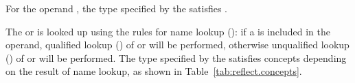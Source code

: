 \begin{std.txt}
\pnum
For the operand \tcode{::}, the type specified by the
 satisfies .

\pnum
The  or  is looked up
using the rules for name lookup (): if a
 is included in the operand, qualified lookup
() of  or
 will be performed,
otherwise unqualified lookup () of
 or  will be performed.
The type specified by the  satisfies concepts
depending on the result of name lookup, as shown in
Table~\ref{tab:reflect.concepts}.

\setcounter{table}{10}


\end{std.txt}
